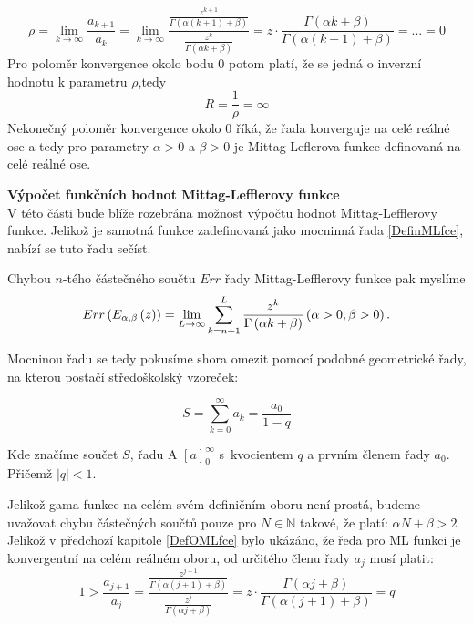 \documentclass[a4paper,12pt,twoside]{article}
\theoremstyle{definition}
\newtheorem{defin}[veta]{Definice}
\theoremstyle{remark}
\numberwithin{equation}{section}
\numberwithin{table}{section}
\numberwithin{figure}{section}
\newcommand{\N}{\mathbb{N}}
\begin{document}
$$\rho = \lim_{k\to\infty} \frac{a_{k+1} }{a_{k}} = \lim_{k\to\infty} \frac{\frac{z^{k+1}}{\Gamma\left( \alpha \left(k+1\right) +\beta \right)}}{\frac{z^{k}}{\Gamma\left( \alpha k +\beta \right)} } = z \cdot \frac{\Gamma\left( \alpha k +\beta \right)}{\Gamma\left( \alpha \left(k+1\right) +\beta \right)} = ... = 0$$
Pro poloměr konvergence okolo bodu 0 potom platí, že se jedná o inverzní hodnotu k parametru $\rho$,tedy
$$R = \frac{1}{\rho} = \infty$$
Nekonečný poloměr konvergence okolo $0$ říká, že řada konverguje na celé reálné ose a tedy pro parametry $\alpha > 0$ a $\beta > 0$ je Mittag-Leflerova funkce definovaná na celé reálné ose.

\textbf{Výpočet funkčních hodnot Mittag-Lefflerovy funkce}\label{DefOMLfce} \\
V této části bude blíže rozebrána možnost výpočtu hodnot Mittag-Lefflerovy funkce. Jelikož je samotná funkce zadefinovaná jako mocninná řada \eqref{DefinMLfce}, nabízí se tuto řadu sečíst.

Chybou $n$-tého částečného součtu $Err$ řady Mittag-Lefflerovy funkce pak myslíme
\begin{equation} \label{ChybaSouctuRady}
	Err \left(E_{\alpha, \beta} \left( z\right)\right) = \lim_{L\to \infty} \sum_{k=n+1}^{L} \frac{z^{k}}{\Gamma\left( \alpha k +\beta \right)} \space \space \left( \alpha > 0, \beta > 0 \right).
\end{equation}

Mocninou řadu se tedy pokusíme shora omezit pomocí podobné geometrické řady, na kterou postačí středoškolský vzoreček:

\begin{equation}\label{SoucetGeometrickeRady}
	S = \sum_{k=0}^{\infty} a_{k} = \frac{a_{0}}{1-q}
\end{equation} 

Kde značíme součet $S$, řadu A $\left[a\right]_{0}^{\infty}$ s~kvocientem $q$ a prvním členem řady $a_0$. Přičemž $ |q| < 1$.

Jelikož gama funkce na celém svém definičním oboru není prostá, budeme uvažovat chybu částečných součtů pouze pro $N \in \N$ takové, že platí: $\alpha N + \beta > 2$
Jelikož v předchozí kapitole \ref{DefOMLfce} bylo ukázáno, že ředa pro ML funkci je konvergentní na celém reálném oboru, od určitého členu řady $a_j$ musí platit:
$$1 > \frac{ a_{j+1}}{a_{j}} = \frac{\frac{z^{j+1}}{\Gamma\left(\alpha \left(j+1\right) + \beta\right)}}{\frac{z^{j}}{\Gamma\left(\alpha j + \beta\right)}} = z \cdot \frac{\Gamma \left(\alpha j + \beta\right)}{\Gamma \left(\alpha \left(j+1\right) + \beta\right)} = q$$
\end{document}
